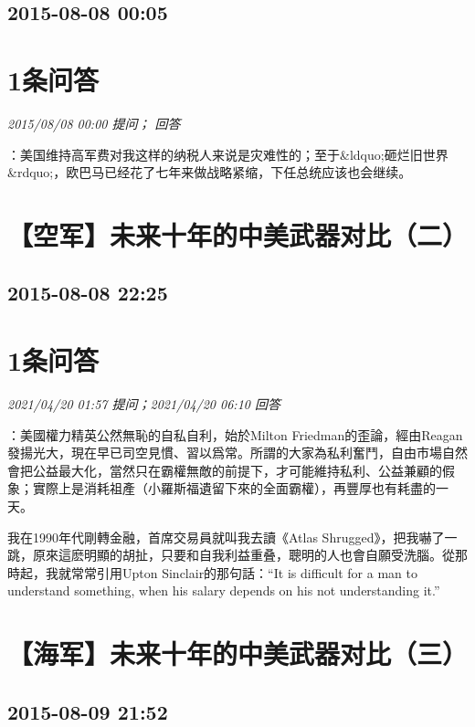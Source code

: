 \documentclass[twocolumn]{ctexart}
\begin{document}
\subsection{2015-08-08 00:05}


\section{1条问答}

\textit{\hfill\noindent\small 2015/08/08 00:00 提问； 回答}

：美国维持高军费对我这样的纳税人来说是灾难性的；至于\&ldquo;砸烂旧世界\&rdquo;，欧巴马已经花了七年来做战略紧缩，下任总统应该也会继续。\\


\section{【空军】未来十年的中美武器对比（二）}
\subsection{2015-08-08 22:25}


\section{1条问答}

\textit{\hfill\noindent\small 2021/04/20 01:57 提问；2021/04/20 06:10 回答}

：美國權力精英公然無恥的自私自利，始於Milton Friedman的歪論，經由Reagan發揚光大，現在早已司空見慣、習以爲常。所謂的大家為私利奮鬥，自由市場自然會把公益最大化，當然只在霸權無敵的前提下，才可能維持私利、公益兼顧的假象；實際上是消耗祖產（小羅斯福遺留下來的全面霸權），再豐厚也有耗盡的一天。

我在1990年代剛轉金融，首席交易員就叫我去讀《Atlas Shrugged》，把我嚇了一跳，原來這麽明顯的胡扯，只要和自我利益重叠，聰明的人也會自願受洗腦。從那時起，我就常常引用Upton Sinclair的那句話：“It is difficult for a man to understand something, when his salary depends on his not understanding it.”
\\


\section{【海军】未来十年的中美武器对比（三）}
\subsection{2015-08-09 21:52}
\end{document}
